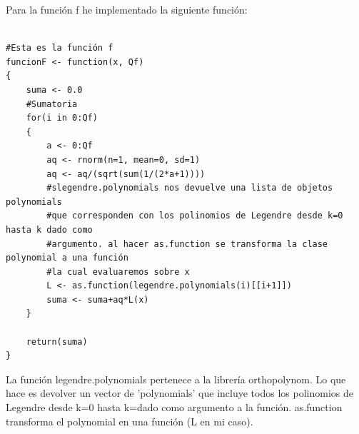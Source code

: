 	Para la función f he implementado la siguiente función:
	\begin{lstlisting}
	
#Esta es la función f
funcionF <- function(x, Qf)
{
	suma <- 0.0
	#Sumatoria
	for(i in 0:Qf)
	{
		a <- 0:Qf
		aq <- rnorm(n=1, mean=0, sd=1)
		aq <- aq/(sqrt(sum(1/(2*a+1))))
		#slegendre.polynomials nos devuelve una lista de objetos polynomials
		#que corresponden con los polinomios de Legendre desde k=0 hasta k dado como
		#argumento. al hacer as.function se transforma la clase polynomial a una función
		#la cual evaluaremos sobre x
		L <- as.function(legendre.polynomials(i)[[i+1]])
		suma <- suma+aq*L(x)
	}
	
	return(suma)
}
	\end{lstlisting}
	La función legendre.polynomials pertenece a la librería orthopolynom. Lo que hace es devolver un vector de 'polynomials' que incluye todos los polinomios de Legendre desde k=0 hasta k=dado como argumento a la función. as.function transforma el polynomial en una función (L en mi caso).
	
